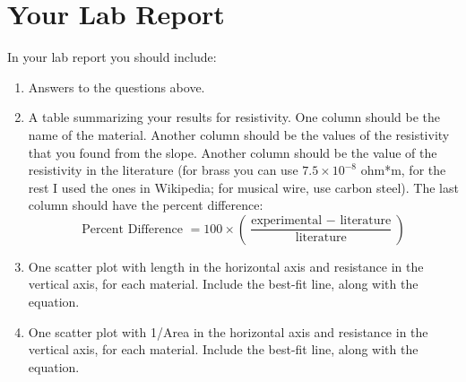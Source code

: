 \section{Your Lab Report}
In your lab report you should include:
\begin{enumerate}
	\item Answers to the questions above.
	\item A table summarizing your results for resistivity. One column should be the name of the material. Another column should be the values of the resistivity that you found from the slope. Another column should be the value of the resistivity in the literature (for brass you can use $7.5 \times 10^{-8}$ ohm*m, for the rest I used the ones in Wikipedia; for musical wire, use carbon steel). The last column should have the percent difference:
	\begin{equation}
		\text{Percent Difference } = 100 \times \left( \frac{\text{experimental } - \text{ literature}}{\text{literature}} \right)
	\end{equation}
	\item One scatter plot with length in the horizontal axis and resistance in the vertical axis, for each material. Include the best-fit line, along with the equation.
	\item One scatter plot with 1/Area in the horizontal axis and resistance in the vertical axis, for each material. Include the best-fit line, along with the equation.
\end{enumerate}
